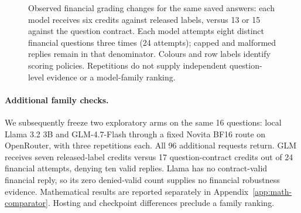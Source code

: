 \begin{figure}[!ht]
\centering
{}
\caption{Observed financial grading changes for the same saved answers: each model receives six credits against released labels, versus 13 or 15 against the question contract. Each model attempts eight distinct financial questions three times (24 attempts); capped and malformed replies remain in that denominator. Colours and row labels identify scoring policies. Repetitions do not supply independent question-level evidence or a model-family ranking.}
\label{fig:local-grading}
\end{figure}
\FloatBarrier

\paragraph{Additional family checks.}
We subsequently freeze two exploratory arms on the same 16 questions: local Llama 3.2 3B and GLM-4.7-Flash through a fixed Novita BF16 route on OpenRouter, with three repetitions each. All 96 additional requests return. GLM receives seven released-label credits versus 17 question-contract credits out of 24 financial attempts, denying ten valid replies. Llama has no contract-valid financial reply, so its zero denied-valid count supplies no financial robustness evidence. Mathematical results are reported separately in Appendix~\ref{app:math-comparator}. Hosting and checkpoint differences preclude a family ranking.

